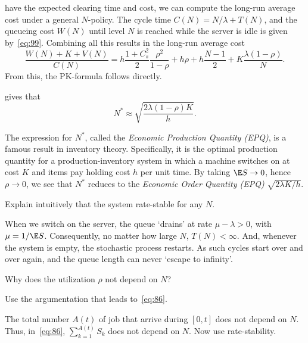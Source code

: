  have the expected clearing time and cost, we can compute the long-run average cost under a general $N$-policy.
The cycle time $C(N) = N/\lambda + T(N)$, and the queueing cost $W(N)$ until level $N$ is reached while the server is idle is given by~\cref{eq:99}.
Combining all this results in the long-run average cost
\begin{equation}  \label{eq:100}
    \frac{W(N) + K + V(N)}{C(N)}
    = h \frac{1+ C_s^2}2 \frac{\rho^2}{1-\rho} + h \rho + h \frac{N-1}2 + K \frac{\lambda(1-\rho)}N.
\end{equation}
From this, the PK-formula follows directly.

 gives that
\begin{equation*}
  N^* \approx \sqrt{\frac{2\lambda(1-\rho)K}{h}}.
\end{equation*}

The expression for $N^*$, called the \emph{Economic Production Quantity (EPQ)}, is a famous result in inventory theory.
Specifically, it is the optimal production quantity for a production-inventory system in which a machine switches on at cost $K$ and items pay holding cost $h$ per unit time.
By taking $\E S \to 0$, hence $\rho \to 0$, we see that $N^*$ reduces to the \emph{Economic Order Quantity (EPQ)} $\sqrt{2\lambda K/h}$.





\begin{exercise}
Explain intuitively that the system rate-stable for any $N$.
\begin{solution}
  When we switch on the server, the queue `drains' at rate $\mu-\lambda>0$, with $\mu=1/\E S$.
  Consequently, no matter how large $N$, $T(N)<\infty$.
  And, whenever the system is empty, the stochastic process restarts.
  As such cycles start over and over again, and the queue length can never `escape to infinity'.
\end{solution}
\end{exercise}


\begin{exercise}
  Why does the utilization $\rho$ not depend on $N$?
\begin{hint}
 Use the argumentation that leads to~\cref{eq:86}.
\end{hint}
\begin{solution}
  The total number $A(t)$ of job that arrive during $[0,t]$ does not depend on $N$.
  Thus, in~\cref{eq:86}, $\sum_{k=1}^{A(t)}S_k$ does not depend on $N$.
  Now use rate-stability.
\end{solution}
\end{exercise}

